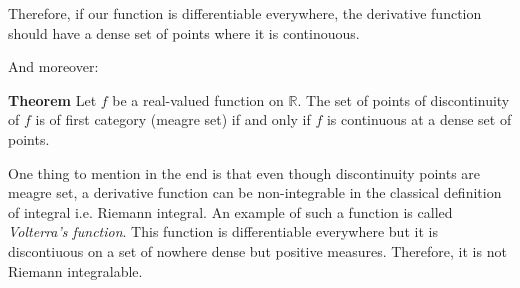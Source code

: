 \documentclass[11pt]{article}
\begin{document}
Therefore, if our function is differentiable everywhere, the derivative function should have a dense set of points where it is continouous.

And moreover:

\textbf{Theorem} Let \(f\) be a real-valued function on \(\mathbb{R}\). The set of points of discontinuity of \(f\) is of first category (meagre set) if and only if \(f\) is continuous at a dense set of points.

One thing to mention in the end is that even though discontinuity points are meagre set, a derivative function can be non-integrable in the classical definition of integral i.e. Riemann integral.
An example of such a function is called \emph{Volterra's function}.
This function is differentiable everywhere but it is discontiuous on a set of nowhere dense but positive measures.
Therefore, it is not Riemann integralable.
\end{document}
